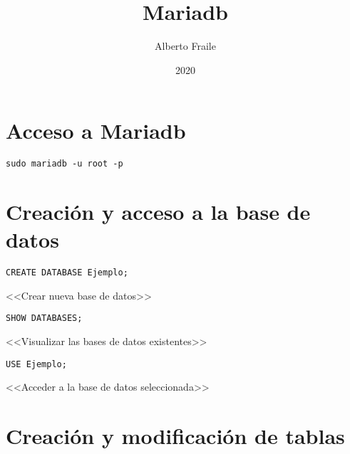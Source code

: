 \documentclass[a4paper, 11pt, titlepage]{article}
\title{Mariadb}
\author{Alberto Fraile}
\date{2020}
\begin{document}
\maketitle
\tableofcontents
\newpage

\section*{Acceso a Mariadb}

\begin{verbatim}
sudo mariadb -u root -p 
\end{verbatim}

\section*{Creación y acceso a la base de datos} 

\begin{verbatim}
CREATE DATABASE Ejemplo;
\end{verbatim}
<<Crear nueva base de datos>> 
\begin{verbatim}
SHOW DATABASES; 
\end{verbatim}
<<Visualizar las bases de datos existentes>> 
\begin{verbatim}
USE Ejemplo; 
\end{verbatim}
<<Acceder a la base de datos seleccionada>> \\

\section*{Creación y modificación de tablas}
\end{document}
